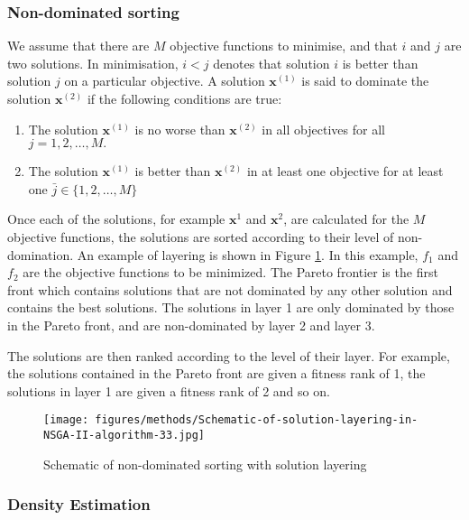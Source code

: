 \documentclass[10pt, conference, compsocconf]{IEEEtran}
\begin{document}
\subsubsection{Non-dominated sorting}

We assume that there are $M$ objective functions to minimise, and that $i$ and $j$ are two solutions. In minimisation, $i<j$ denotes that solution $i$ is better than solution $j$ on a particular objective. A solution $\mathbf{x}^{(1)}$ is said to dominate the solution $\mathbf{x}^{(2)}$ if the following conditions are true:

\begin{enumerate}
  \item The solution $\mathbf{x}^{(1)}$ is no worse than $\mathbf{x}^{(2)}$ in all objectives for all $j=1,2,\ldots,M.$
  \item The solution $\mathbf{x}^{(1)}$ is better than $\mathbf{x}^{(2)}$ in at least one objective for at least one $\bar{j}\in \{ 1,2,\ldots,M\}$
\end{enumerate}


Once each of the solutions, for example $\mathbf{x}^1$ and $\mathbf{x}^2$, are calculated for the $M$ objective functions, the solutions are sorted according to their level of non-domination. An example of layering is shown in Figure \ref{fig:pareto-layering}. In this example, $f_1$ and $f_2$ are the objective functions to be minimized. The Pareto frontier is the first front which contains solutions that are not dominated by any other solution and contains the best solutions. The solutions in layer 1 are only dominated by those in the Pareto front, and are non-dominated by layer 2 and layer 3. 

The solutions are then ranked according to the level of their layer. For example, the solutions contained in the Pareto front are given a fitness rank of 1, the solutions in layer 1 are given a fitness rank of 2 and so on.

\begin{figure}[t]
  \texttt{[image: figures/methods/Schematic-of-solution-layering-in-NSGA-II-algorithm-33.jpg]}
  \caption{Schematic of non-dominated sorting with solution layering \cite{Ahmadi2013}}
  \label{fig:pareto-layering}
\end{figure}


\subsubsection{Density Estimation}
\end{document}
